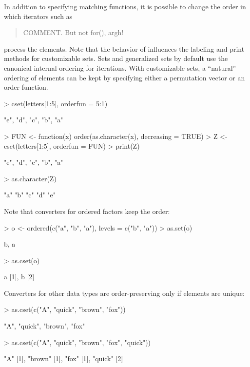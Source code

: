 \documentclass[article]{jss}
\newcommand{\comment}[1]{\begin{quote} COMMENT. #1\end{quote}}
\newcommand{\codefun}[1]{\code{#1()}}
\begin{document}
In addition to specifying matching functions, it is possible to
change the order in which
iterators such as \codefun{as.list}
\comment{But not for(), argh!}
process the elements. Note that the behavior of \codefun{as.list}
influences the labeling and print methods for
customizable sets. Sets and generalized sets by default
use the canonical internal ordering for iterations. With
customizable sets, a ``natural'' ordering of elements can be kept
by specifying either a permutation vector or an order function.

\begin{Schunk}
\begin{Sinput}
> cset(letters[1:5], orderfun = 5:1)
\end{Sinput}
\begin{Soutput}
{"e", "d", "c", "b", "a"}
\end{Soutput}
\begin{Sinput}
> FUN <- function(x) order(as.character(x), decreasing = TRUE)
> Z <- cset(letters[1:5], orderfun = FUN)
> print(Z)
\end{Sinput}
\begin{Soutput}
{"e", "d", "c", "b", "a"}
\end{Soutput}
\begin{Sinput}
> as.character(Z)
\end{Sinput}
\begin{Soutput}
[1] "a\n" "b\n" "c\n" "d\n" "e\n"
\end{Soutput}
\end{Schunk}
Note that converters for ordered factors keep the order:
\begin{Schunk}
\begin{Sinput}
> o <- ordered(c("a", "b", "a"), levels = c("b", "a"))
> as.set(o)
\end{Sinput}
\begin{Soutput}
{b, a}
\end{Soutput}
\begin{Sinput}
> as.cset(o)
\end{Sinput}
\begin{Soutput}
{a [1], b [2]}
\end{Soutput}
\end{Schunk}
Converters for other data types are order-preserving only
if elements are unique:
\begin{Schunk}
\begin{Sinput}
> as.cset(c("A", "quick", "brown", "fox"))
\end{Sinput}
\begin{Soutput}
{"A", "quick", "brown", "fox"}
\end{Soutput}
\begin{Sinput}
> as.cset(c("A", "quick", "brown", "fox", "quick"))
\end{Sinput}
\begin{Soutput}
{"A" [1], "brown" [1], "fox" [1], "quick" [2]}
\end{Soutput}
\end{Schunk}
\end{document}
